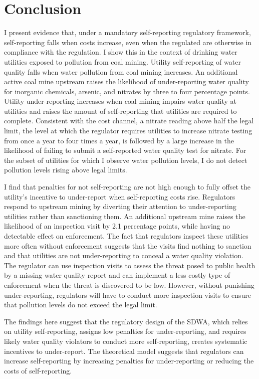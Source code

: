 \documentclass[12pt]{article}
\begin{document}
\section{Conclusion}\label{sec:conclusion}

I present evidence that, under a mandatory self-reporting regulatory framework, self-reporting falls when costs increase, even when the regulated are otherwise in compliance with the regulation. I show this in the context of drinking water utilities exposed to pollution from coal mining. Utility self-reporting of water quality falls when water pollution from coal mining increases. An additional active coal mine upstream raises the likelihood of under-reporting water quality for inorganic chemicals, arsenic, and nitrates by three to four percentage points. Utility under-reporting increases when coal mining impairs water quality at utilities and raises the amount of self-reporting that utilities are required to complete. Consistent with the cost channel, a nitrate reading above half the legal limit, the level at which the regulator requires utilities to increase nitrate testing from once a year to four times a year, is followed by a large increase in the likelihood of failing to submit a self-reported water quality test for nitrate. For the subset of utilities for which I observe water pollution levels, I do not detect pollution levels rising above legal limits.

I find that penalties for not self-reporting are not high enough to fully offset the utility's incentive to under-report when self-reporting costs rise. Regulators respond to upstream mining by diverting their attention to under-reporting utilities rather than sanctioning them. An additional upstream mine raises the likelihood of an inspection visit by 2.1 percentage points, while having no detectable effect on enforcement. The fact that regulators inspect these utilities more often without enforcement suggests that the visits find nothing to sanction and that utilities are not under-reporting to conceal a water quality violation. The regulator can use inspection visits to assess the threat posed to public health by a missing water quality report and can implement a less costly type of enforcement when the threat is discovered to be low. However, without punishing under-reporting, regulators will have to conduct more inspection visits to ensure that pollution levels do not exceed the legal limit.

The findings here suggest that the regulatory design of the SDWA, which relies on utility self-reporting, assigns low penalties for under-reporting, and requires likely water quality violators to conduct more self-reporting, creates systematic incentives to under-report. The theoretical model suggests that regulators can increase self-reporting by increasing penalties for under-reporting or reducing the costs of self-reporting.
\end{document}
